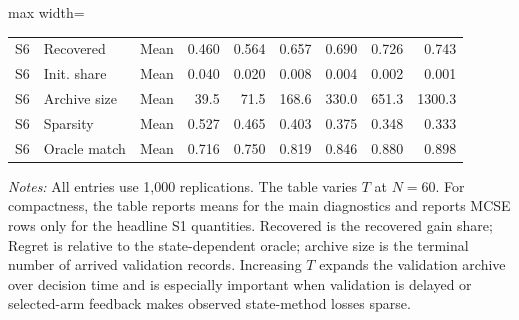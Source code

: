 \documentclass[a4paper,12pt]{article}
\newcommand{\1}{\mathbf{1}}
\newcommand{\ExhibitNote}[1]{\begin{minipage}{0.94\textwidth}\footnotesize\emph{Notes:} #1\end{minipage}}
\begin{document}
\begin{landscape}
\begin{table}[p]
\begin{adjustbox}{max width=\linewidth}
\begin{tabular}{@{}lllrrrrrr@{}}
S6 & Recovered & Mean & 0.460 & 0.564 & 0.657 & 0.690 & 0.726 & 0.743 \\
S6 & Init. share & Mean & 0.040 & 0.020 & 0.008 & 0.004 & 0.002 & 0.001 \\
S6 & Archive size & Mean & 39.5 & 71.5 & 168.6 & 330.0 & 651.3 & 1300.3 \\
S6 & Sparsity & Mean & 0.527 & 0.465 & 0.403 & 0.375 & 0.348 & 0.333 \\
S6 & Oracle match & Mean & 0.716 & 0.750 & 0.819 & 0.846 & 0.880 & 0.898 \\
\bottomrule
\end{tabular}
\end{adjustbox}
\par\medskip
\ExhibitNote{All entries use 1,000 replications. The table varies $T$ at $N=60$. For compactness, the table reports means for the main diagnostics and reports MCSE rows only for the headline S1 quantities. Recovered is the recovered gain share; Regret is relative to the state-dependent oracle; archive size is the terminal number of arrived validation records. Increasing $T$ expands the validation archive over decision time and is especially important when validation is delayed or selected-arm feedback makes observed state-method losses sparse.}
\end{table}
\end{landscape}
\end{document}

